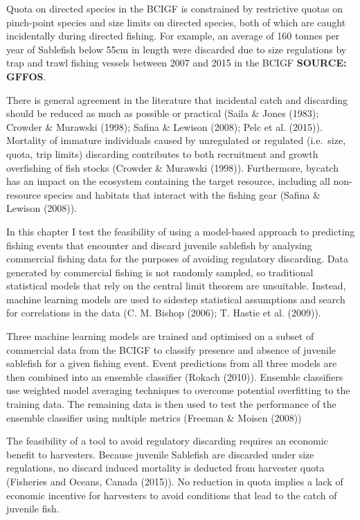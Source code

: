 \documentclass[12pt,]{scrartcl}
\begin{document}
Quota on directed species in the BCIGF is constrained by restrictive
quotas on pinch-point species and size limits on directed species, both
of which are caught incidentally during directed fishing. For example,
an average of 160 tonnes per year of Sablefish below 55cm in length were
discarded due to size regulations by trap and trawl fishing vessels
between 2007 and 2015 in the BCIGF \textbf{SOURCE: GFFOS}.

There is general agreement in the literature that incidental catch and
discarding should be reduced as much as possible or practical (Saila \&
Jones (1983); Crowder \& Murawski (1998); Safina \& Lewison (2008); Pelc
et al. (2015)). Mortality of immature individuals caused by unregulated
or regulated (i.e.~size, quota, trip limits) discarding contributes to
both recruitment and growth overfishing of fish stocks (Crowder \&
Murawski (1998)). Furthermore, bycatch has an impact on the ecosystem
containing the target resource, including all non-resource species and
habitats that interact with the fishing gear (Safina \& Lewison (2008)).

In this chapter I test the feasibility of using a model-based approach
to predicting fishing events that encounter and discard juvenile
sablefish by analysing commercial fishing data for the purposes of
avoiding regulatory discarding. Data generated by commercial fishing is
not randomly sampled, so traditional statistical models that rely on the
central limit theorem are unsuitable. Instead, machine learning models
are used to sidestep statistical assumptions and search for correlations
in the data (C. M. Bishop (2006); T. Hastie et al. (2009)).

Three machine learning models are trained and optimised on a subset of
commercial data from the BCIGF to classify presence and absence of
juvenile sablefish for a given fishing event. Event predictions from all
three models are then combined into an ensemble classifier (Rokach
(2010)). Ensemble classifiers use weighted model averaging techniques to
overcome potential overfitting to the training data. The remaining data
is then used to test the performance of the ensemble classifier using
multiple metrics (Freeman \& Moisen (2008))

The feasibility of a tool to avoid regulatory discarding requires an
economic benefit to harvesters. Because juvenile Sablefish are discarded
under size regulations, no discard induced mortality is deducted from
harvester quota (Fisheries and Oceans, Canada (2015)). No reduction in
quota implies a lack of economic incentive for harvesters to avoid
conditions that lead to the catch of juvenile fish.
\end{document}
